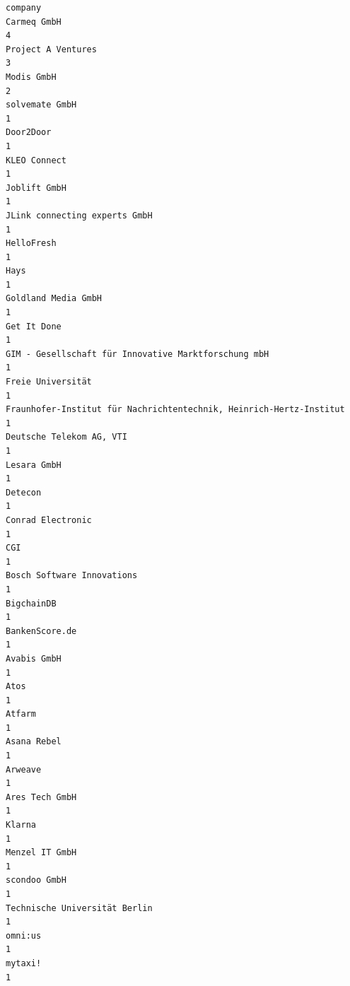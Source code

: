 \documentclass[11pt]{article}
\begin{document}
\begin{enumerate}
\begin{enumerate}
\begin{enumerate}
\begin{verbatim}
company
Carmeq GmbH                                                            4
Project A Ventures                                                     3
Modis GmbH                                                             2
solvemate GmbH                                                         1
Door2Door                                                              1
KLEO Connect                                                           1
Joblift GmbH                                                           1
JLink connecting experts GmbH                                          1
HelloFresh                                                             1
Hays                                                                   1
Goldland Media GmbH                                                    1
Get It Done                                                            1
GIM - Gesellschaft für Innovative Marktforschung mbH                   1
Freie Universität                                                      1
Fraunhofer-Institut für Nachrichtentechnik, Heinrich-Hertz-Institut    1
Deutsche Telekom AG, VTI                                               1
Lesara GmbH                                                            1
Detecon                                                                1
Conrad Electronic                                                      1
CGI                                                                    1
Bosch Software Innovations                                             1
BigchainDB                                                             1
BankenScore.de                                                         1
Avabis GmbH                                                            1
Atos                                                                   1
Atfarm                                                                 1
Asana Rebel                                                            1
Arweave                                                                1
Ares Tech GmbH                                                         1
Klarna                                                                 1
Menzel IT GmbH                                                         1
scondoo GmbH                                                           1
Technische Universität Berlin                                          1
omni:us                                                                1
mytaxi!                                                                1

\end{verbatim}
\end{enumerate}
\end{enumerate}
\end{enumerate}
\end{document}
